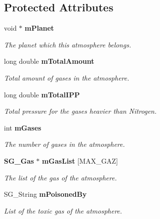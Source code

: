 \subsection*{Protected Attributes}
\begin{CompactItemize}
\item 
void $\ast$ {\bf m\-Planet}\label{class_s_g___atmosphere_p0}

\begin{CompactList}\small\item\em The planet which this atmosphere belongs. \item\end{CompactList}\item 
long double {\bf m\-Total\-Amount}\label{class_s_g___atmosphere_p1}

\begin{CompactList}\small\item\em Total amount of gases in the atmosphere. \item\end{CompactList}\item 
long double {\bf m\-Total\-IPP}\label{class_s_g___atmosphere_p2}

\begin{CompactList}\small\item\em Total pressure for the gases heavier than Nitrogen. \item\end{CompactList}\item 
int {\bf m\-Gases}\label{class_s_g___atmosphere_p3}

\begin{CompactList}\small\item\em The number of gases in the atmosphere. \item\end{CompactList}\item 
{\bf SG\_\-Gas} $\ast$ {\bf m\-Gas\-List} [MAX\_\-GAZ]\label{class_s_g___atmosphere_p4}

\begin{CompactList}\small\item\em The list of the gas of the atmosphere. \item\end{CompactList}\item 
SG\_\-String {\bf m\-Poisoned\-By}\label{class_s_g___atmosphere_p5}

\begin{CompactList}\small\item\em List of the toxic gas of the atmosphere. \item\end{CompactList}\end{CompactItemize}


